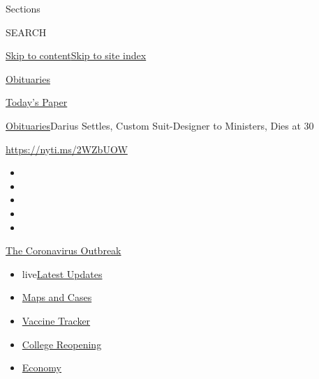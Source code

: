 Sections

SEARCH

\protect\hyperlink{site-content}{Skip to
content}\protect\hyperlink{site-index}{Skip to site index}

\href{https://www.nytimes3xbfgragh.onion/section/obituaries}{Obituaries}

\href{https://myaccount.nytimes3xbfgragh.onion/auth/login?response_type=cookie\&client_id=vi}{}

\href{https://www.nytimes3xbfgragh.onion/section/todayspaper}{Today's
Paper}

\href{/section/obituaries}{Obituaries}\textbar{}Darius Settles, Custom
Suit-Designer to Ministers, Dies at 30

\url{https://nyti.ms/2WZbUOW}

\begin{itemize}
\item
\item
\item
\item
\item
\end{itemize}

\href{https://www.nytimes3xbfgragh.onion/news-event/coronavirus?action=click\&pgtype=Article\&state=default\&region=TOP_BANNER\&context=storylines_menu}{The
Coronavirus Outbreak}

\begin{itemize}
\tightlist
\item
  live\href{https://www.nytimes3xbfgragh.onion/2020/08/04/world/coronavirus-covid-19.html?action=click\&pgtype=Article\&state=default\&region=TOP_BANNER\&context=storylines_menu}{Latest
  Updates}
\item
  \href{https://www.nytimes3xbfgragh.onion/interactive/2020/us/coronavirus-us-cases.html?action=click\&pgtype=Article\&state=default\&region=TOP_BANNER\&context=storylines_menu}{Maps
  and Cases}
\item
  \href{https://www.nytimes3xbfgragh.onion/interactive/2020/science/coronavirus-vaccine-tracker.html?action=click\&pgtype=Article\&state=default\&region=TOP_BANNER\&context=storylines_menu}{Vaccine
  Tracker}
\item
  \href{https://www.nytimes3xbfgragh.onion/2020/08/02/us/covid-college-reopening.html?action=click\&pgtype=Article\&state=default\&region=TOP_BANNER\&context=storylines_menu}{College
  Reopening}
\item
  \href{https://www.nytimes3xbfgragh.onion/live/2020/08/03/business/stock-market-today-coronavirus?action=click\&pgtype=Article\&state=default\&region=TOP_BANNER\&context=storylines_menu}{Economy}
\end{itemize}

